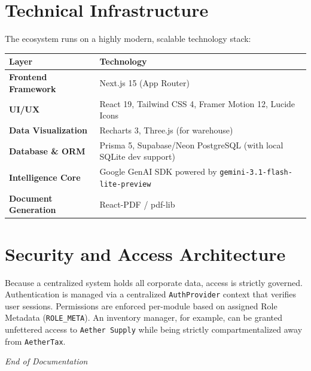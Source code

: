 \documentclass[12pt,a4paper]{article}
\begin{document}
\section{Technical Infrastructure}

The ecosystem runs on a highly modern, scalable technology stack:

\begin{table}[h]
\centering
\renewcommand{\arraystretch}{1.3}
\begin{tabularx}{\textwidth}{l X}
\toprule
\textbf{Layer} & \textbf{Technology} \\
\midrule
\textbf{Frontend Framework} & Next.js 15 (App Router) \\
\textbf{UI/UX} & React 19, Tailwind CSS 4, Framer Motion 12, Lucide Icons \\
\textbf{Data Visualization} & Recharts 3, Three.js (for warehouse) \\
\textbf{Database \& ORM} & Prisma 5, Supabase/Neon PostgreSQL (with local SQLite dev support) \\
\textbf{Intelligence Core} & Google GenAI SDK powered by \texttt{gemini-3.1-flash-lite-preview} \\
\textbf{Document Generation}& React-PDF / pdf-lib \\
\bottomrule
\end{tabularx}
\end{table}

\section{Security and Access Architecture}

Because a centralized system holds all corporate data, access is strictly governed. 
Authentication is managed via a centralized \texttt{AuthProvider} context that verifies user sessions. Permissions are enforced per-module based on assigned Role Metadata (\texttt{ROLE\_META}). An inventory manager, for example, can be granted unfettered access to \texttt{Aether Supply} while being strictly compartmentalized away from \texttt{AetherTax}.

\vspace{2em}
\begin{center}
\textit{End of Documentation}
\end{center}
\end{document}
